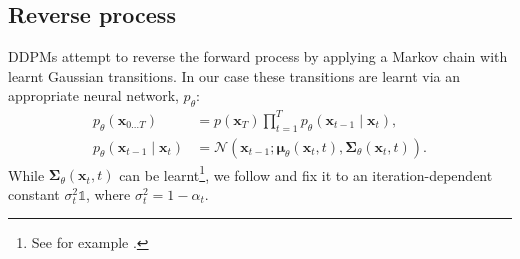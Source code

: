 \documentclass[fleqn,usenatbib]{mnras}
\begin{document}
\subsection{Reverse process}

DDPMs attempt to reverse the forward process by applying a Markov chain with
learnt Gaussian transitions. In our case these transitions are learnt via an
appropriate neural network, $p_\theta$:
\begin{align}
    p_\theta(\mathbf{x}_{0 \ldots T}) &= p(\mathbf{x}_T)\prod^T_{t=1} p_\theta(\mathbf{x}_{t-1} \mid \mathbf{x}_t),\\
    p_\theta(\mathbf{x}_{t - 1} \mid \mathbf{x}_t) &= \mathcal{N}(\mathbf{x}_{t - 1}; \boldsymbol{\mu}_\theta(\mathbf{x}_t, t),\boldsymbol{\Sigma}_\theta(\mathbf{x}_t, t)).
\end{align}
While $\mathbf{\Sigma}_\theta(\mathbf{x}_t, t)$ can be learnt\footnote{See for
example \citet{cite_nichol2021}.}, we follow \citet{cite_ho2020} and fix it to
an iteration-dependent constant $\sigma_t^2 \mathds{1}$, where
\mbox{$\sigma^2_t = 1 - \alpha_t$}.
\end{document}
